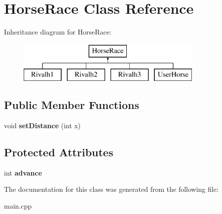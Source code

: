 \hypertarget{class_horse_race}{\section{Horse\-Race Class Reference}
\label{class_horse_race}
}
Inheritance diagram for Horse\-Race\-:\begin{figure}[H]
\begin{center}
\leavevmode
\includegraphics[height=2.000000cm]{class_horse_race}
\end{center}
\end{figure}
\subsection*{Public Member Functions}
\begin{DoxyCompactItemize}
\item 
\hypertarget{class_horse_race_aeb7d6f73ffdc7440e7eaf3d0761de6e5}{void {\bfseries set\-Distance} (int x)}\label{class_horse_race_aeb7d6f73ffdc7440e7eaf3d0761de6e5}

\end{DoxyCompactItemize}
\subsection*{Protected Attributes}
\begin{DoxyCompactItemize}
\item 
\hypertarget{class_horse_race_a21c58b9c94ac0763fc8b8f02bb07a638}{int {\bfseries advance}}\label{class_horse_race_a21c58b9c94ac0763fc8b8f02bb07a638}

\end{DoxyCompactItemize}


The documentation for this class was generated from the following file\-:\begin{DoxyCompactItemize}
\item 
main.\-cpp\end{DoxyCompactItemize}
